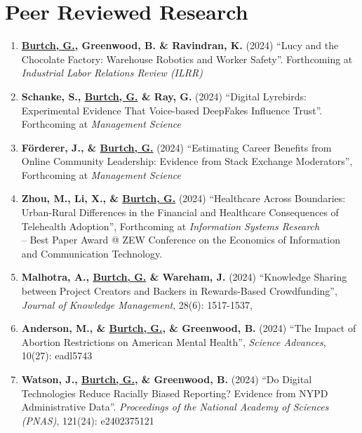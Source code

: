 \documentclass[10.5pt,letterpaper,sans]{moderncv}        %
\begin{document}
\section{Peer Reviewed Research}

\smallskip

\begin{enumerate}[leftmargin=!,labelindent=5pt,itemindent=-15pt]

\item \textbf{\underline{Burtch, G.}, Greenwood, B. \& Ravindran, K.} (2024) ``Lucy and the Chocolate Factory: Warehouse Robotics and Worker Safety''. Forthcoming at \textit{Industrial Labor Relations Review (ILRR)} 

\item \textbf{Schanke, S.,  \underline{Burtch, G.} \& Ray, G.} (2024) ``Digital Lyrebirds: Experimental Evidence That Voice-based DeepFakes Influence Trust''. Forthcoming at \textit{Management Science} 

\item \textbf{F{\"o}rderer, J., \& \underline{Burtch, G.}} (2024) ``Estimating Career Benefits from Online Community Leadership: Evidence from Stack Exchange Moderators'', Forthcoming at \textit{Management Science}

\item \textbf{Zhou, M., Li, X., \& \underline{Burtch, G.}} (2024) ``Healthcare Across Boundaries: Urban-Rural Differences in the Financial and Healthcare Consequences of Telehealth Adoption'', Forthcoming at \textit{Information Systems Research} \\-- Best Paper Award @ ZEW Conference on the Economics of Information and Communication Technology.

\item \textbf{Malhotra, A., \underline{Burtch, G.} \& Wareham, J.} (2024) ``Knowledge Sharing between Project Creators and Backers in Rewards-Based Crowdfunding'', \textit{Journal of Knowledge Management}, 28(6): 1517-1537,

\item \textbf{Anderson, M., \& \underline{Burtch, G.}, \& Greenwood, B.} (2024) ``The Impact of Abortion Restrictions on American Mental Health'', \textit{Science Advances}, 10(27): eadl5743

\item \textbf{Watson, J., \underline{Burtch, G.}, \& Greenwood, B.} (2024) ``Do Digital Technologies Reduce Racially Biased Reporting? Evidence from NYPD Administrative Data''. \textit{Proceedings of the National Academy of Sciences (PNAS)}, 121(24): e2402375121


\end{enumerate}
\end{document}
